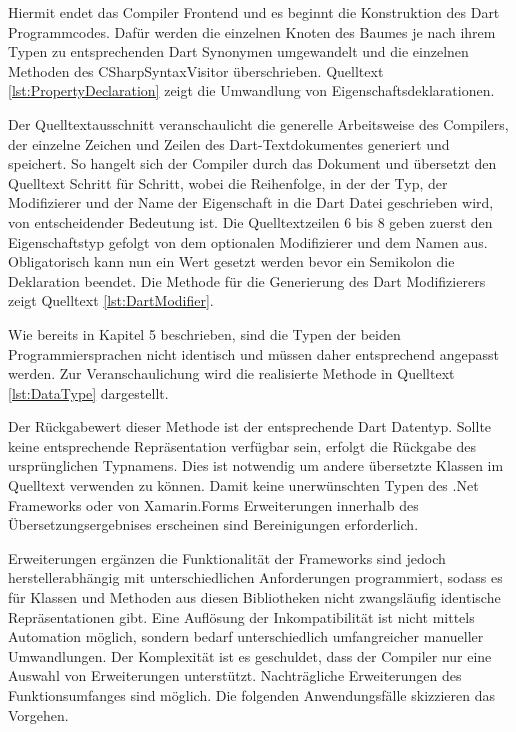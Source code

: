 Hiermit endet das Compiler Frontend und es beginnt die Konstruktion des Dart Programmcodes.  Dafür werden die einzelnen Knoten des Baumes je nach ihrem Typen zu entsprechenden Dart Synonymen umgewandelt und die einzelnen Methoden des \glq CSharpSyntaxVisitor\grq{} überschrieben.  Quelltext \ref{lst:PropertyDeclaration} zeigt die Umwandlung von Eigenschaftsdeklarationen.
\newpage


Der Quelltextausschnitt veranschaulicht die generelle Arbeitsweise des Compilers,  der einzelne Zeichen und Zeilen des Dart-Textdokumentes generiert und speichert.  So hangelt sich der Compiler durch das Dokument und übersetzt den Quelltext Schritt für Schritt, wobei die Reihenfolge, in der der Typ, der Modifizierer und der Name der Eigenschaft in die Dart Datei geschrieben wird,  von entscheidender Bedeutung ist.  Die Quelltextzeilen 6 bis 8 geben zuerst den Eigenschaftstyp gefolgt von dem optionalen Modifizierer und dem Namen aus.  Obligatorisch kann nun ein Wert gesetzt werden bevor ein Semikolon die Deklaration beendet.  Die Methode für die Generierung des Dart Modifizierers zeigt Quelltext \ref{lst:DartModifier}.




Wie bereits in Kapitel 5 beschrieben,  sind die Typen der beiden Programmiersprachen nicht identisch und müssen daher entsprechend angepasst werden.  Zur Veranschaulichung wird die realisierte Methode in Quelltext \ref{lst:DataType} dargestellt. 


Der Rückgabewert dieser Methode ist der entsprechende Dart Datentyp.  Sollte keine entsprechende Repräsentation verfügbar sein,  erfolgt die Rückgabe des ursprünglichen Typnamens.  Dies ist notwendig um andere übersetzte Klassen im Quelltext verwenden zu können.  Damit keine unerwünschten Typen des .Net Frameworks oder von Xamarin.Forms Erweiterungen innerhalb des Übersetzungsergebnises erscheinen sind Bereinigungen erforderlich. 

Erweiterungen ergänzen die Funktionalität der Frameworks sind jedoch herstellerabhängig mit unterschiedlichen Anforderungen programmiert,  sodass es für Klassen und Methoden aus diesen Bibliotheken nicht zwangsläufig identische Repräsentationen gibt.  Eine Auflösung der Inkompatibilität ist nicht mittels Automation möglich, sondern bedarf unterschiedlich umfangreicher manueller Umwandlungen.  Der Komplexität ist es geschuldet,  dass der Compiler nur eine Auswahl von Erweiterungen unterstützt.  Nachträgliche Erweiterungen des Funktionsumfanges sind möglich.  Die folgenden Anwendungsfälle skizzieren das Vorgehen.  


